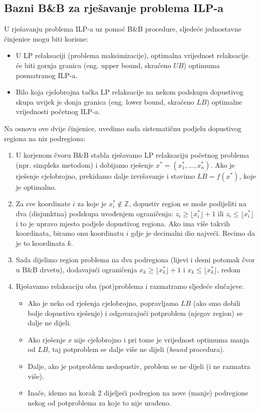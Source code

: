 \documentclass[a4paper, utf8, 11pt, colorlinks]{book}
\theoremstyle{definition}
\begin{document}
\subsection{Bazni B\&B za rješavanje problema ILP-a}

U rješavanju problema  ILP-a uz pomoć B\&B procedure, sljedeće jednostavne činjenice mogu biti korisne:
\begin{itemize}
    \item  U LP relaksaciji (problema 
           maksimizacije), optimalna vrijednost  relaksacije  će biti gornja granica (eng. upper bound, skraćeno $UB$) optimuma posmatranog ILP-a. 
    \item  Bilo koja cjelobrojna tačka LP relaksacije na nekom podskupu  
           dopustivog skupa uvijek je  donja granica (eng. lower bound, skraćeno $LB$) optimalne vrijednosti početnog ILP-a. 
\end{itemize}
Na osnovu ove dvije činjenice, uvedimo sada sistematičnu podjelu dopustivog regiona na niz podregiona:
\begin{enumerate}
    \item U korjenom čvoru B\&B stabla rješavamo LP relaksaciju početnog problema     (npr. simpleks metodom) i dobijamo rješenje $x^*=(x^*_1, \ldots, x^*_n)$.   Ako je rješenje cjelobrojno, prekidamo dalje izvršavanje i stavimo $LB=f(x^*)$, koje je optimalno. %
    \item Za sve koordinate $i$ za koje je $x^*_i \not \in \mathbb{Z}$, dopustiv region se može podijeliti na dva (disjunktna) podskupa uvođenjem ograničenja: $z_i \geq \lfloor x^*_i \rfloor + 1$ ili $z_i \leq \lfloor x^*_i \rfloor$ i to je upravo mjesto podjele dopustivog regiona. Ako ima više takvih koordinata, biramo onu koordinatu $i$ gdje je decimalni dio najveći.  Recimo da je to koordinata $k$.
    \item Sada dijelimo region problema na dva podregiona (lijevi i desni potomak čvor u B\&B drvetu), dodavajući 
          ograničenja $x_k \geq \lfloor x^*_k \rfloor + 1$ i $x_k \leq \lfloor x^*_k \rfloor$, redom
    \item Rješavamo relaksaciju oba (pot)problema i razmatramo sljedeće slučajeve. 
    \begin{itemize}
    	\item  Ako je neko od rješenja cjelobrojno, popravljamo $LB$ (ako smo dobili bolje dopustivo rješenje) i odgovarajući potproblem (njegov region) se dalje ne dijeli. 
    	\item Ako rješenje $x$ nije cjelobrojno i pri tome je vrijednost optimuma manja od $LB$, taj potproblem se dalje više ne dijeli (\emph{bound} procedura). 
    	\item Dalje, ako je potproblem nedopustiv, problem se ne dijeli (i ne razmatra više). 
    	\item Inače, idemo na korak 2 dijeljeći podregion   na nove (manje) podregione nekog od potproblema za koje to nije urađeno.    
    \end{itemize}

\end{enumerate}
\end{document}
